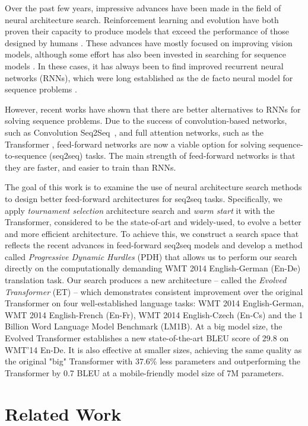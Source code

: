 \documentclass{article}
\begin{document}
Over the past few years, impressive advances have been made in the field of neural architecture search. Reinforcement learning and evolution have both proven their capacity to produce models that exceed the performance of those designed by humans \cite{real19, zoph18}. These advances have mostly focused on improving vision models, although some effort has also been invested in searching for sequence models \cite{zoph16, pham18}. In these cases, it has always been to find improved recurrent neural networks (RNNs), which were long established as the de facto neural model for sequence problems \cite{sutskever14,bahdanau2015}.

However, recent works have shown that there are better alternatives to RNNs for solving sequence problems. Due to the success of convolution-based networks, such as Convolution Seq2Seq~\cite{gehring2017}, and full attention networks, such as the Transformer \cite{vaswani17}, feed-forward networks are now a viable option for solving sequence-to-sequence (seq2seq) tasks. The main strength of feed-forward networks is that they are faster, and  easier to train than RNNs.

The goal of this work is to examine the use of neural architecture search methods to design better feed-forward architectures for seq2seq tasks.   
Specifically, we apply \textit{tournament selection} architecture search and \textit{warm start} it with the Transformer, considered to be the state-of-art and widely-used, to evolve a better and more efficient architecture. To achieve this, we construct a search space that reflects the recent advances in feed-forward seq2seq models and develop a method called \textit{Progressive Dynamic Hurdles} (PDH) that allows us to perform our search directly on the computationally demanding WMT 2014 English-German (En-De) translation task. Our search produces a new architecture -- called the \textit{Evolved Transformer} (ET) -- 
which demonstrates consistent improvement over the original Transformer on four well-established language tasks: WMT 2014 English-German, WMT 2014 English-French (En-Fr), WMT 2014 English-Czech (En-Cs) and the 1 Billion Word Language Model Benchmark (LM1B). At a big model size, the Evolved Transformer establishes a new state-of-the-art BLEU score of 29.8 on WMT'14 En-De. It is also effective at smaller sizes, achieving the same quality as the original "big" Transformer with 37.6\% less parameters and outperforming the Transformer by 0.7 BLEU at a mobile-friendly model size of 7M parameters.

\section{Related Work}
\end{document}
